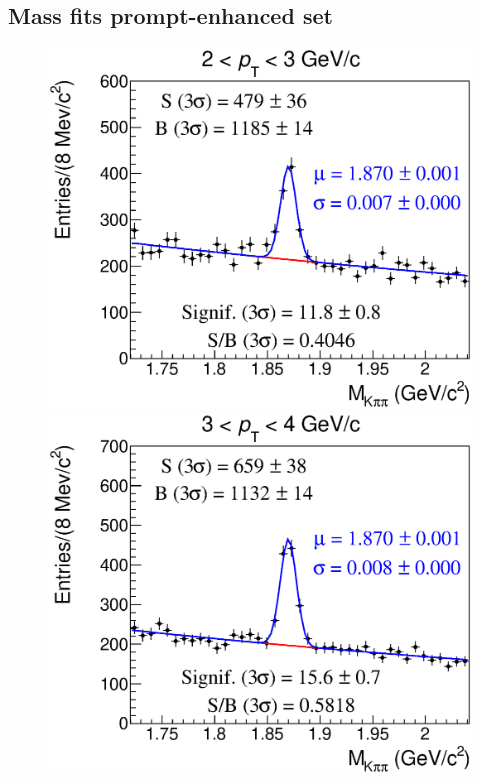 \documentclass[b5paper,10pt,twoside,oldstyle,classica]{toptesi}
\begin{document}
\subsection{Mass fits prompt-enhanced set}
\label{cutvar_massfits_appendix}
\begin{figure}[h]
\begin{center}
\vspace{-0.3cm}
{\includegraphics[scale = 0.25]{MassFitSet1_Pt0.eps}}
\hspace{0cm}
{\includegraphics[scale = 0.25]{MassFitSet1_Pt1.eps}}

\end{center}
\end{figure}
\end{document}
